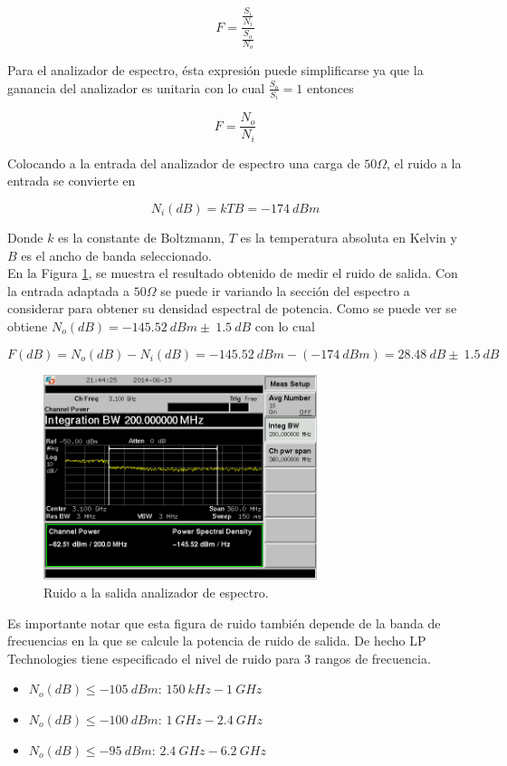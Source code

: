 \documentclass[a4paper,10pt]{article}
\begin{document}
		$$F=\frac{\frac{S_i}{N_i}}{\frac{S_o}{N_o}}$$
		
		\indent Para el analizador de espectro, \'esta expresi\'on puede 
		simplificarse ya que la ganancia del analizador es unitaria con lo cual 
		$\frac{S_o}{S_i}=1$ entonces
		
		$$F=\frac{N_o}{N_i}$$
		
		\indent Colocando a la entrada del analizador de espectro una carga de 
		$50\Omega$, el ruido a la entrada se convierte en 

		$$N_i(dB)=kTB=-174~dBm$$
		
		\indent Donde $k$ es la constante de Boltzmann, $T$ es la temperatura 
		absoluta en Kelvin y $B$ es el ancho de banda seleccionado. \\
		\indent En la Figura \ref{noise}, se muestra el resultado obtenido de 
		medir el ruido de salida. Con la entrada adaptada a $50\Omega$ se puede 
		ir variando la secci\'on del espectro a considerar para obtener su 
		densidad espectral de potencia. Como se puede ver se obtiene 
		$N_o(dB)=-145.52~dBm\pm~1.5~dB$ con lo cual
		
		$$F(dB)=N_o(dB)-N_i(dB)=-145.52~dBm-(-174~dBm)=28.48~dB\pm~1.5~dB$$
		
		\begin{figure}[!htb]
				\centering
				\includegraphics[width=8cm]
				{Imagenes/SCREN464.png}
				\caption{Ruido a la salida  analizador de espectro.}
				\label{noise} 
		\end{figure}
		
		\indent Es importante notar que esta figura de ruido tambi\'en depende 
		de la banda de frecuencias en la que se calcule la potencia de ruido de 
		salida. De hecho LP Technologies tiene especificado el nivel de ruido 
		para 3 rangos de frecuencia.
		
		\begin{itemize}
			\item $N_o(dB)\leq-105~dBm$: 	$150~kHz-1~GHz$
			\item $N_o(dB)\leq-100~dBm$:	 $1~GHz-2.4~GHz$
			\item $N_o(dB)\leq-95~dBm$:	 $2.4~GHz-6.2~GHz$
		\end{itemize}
		
\end{document}
